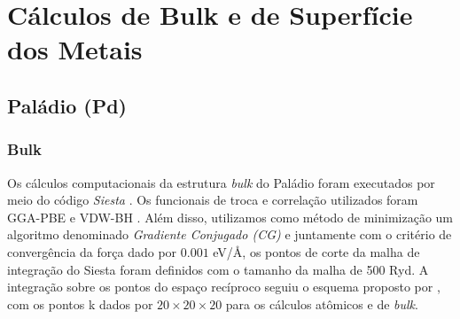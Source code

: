 \chapter{Cálculos de Bulk e de Superfície dos Metais\label{apd:metal}}


\section{Paládio (Pd)}
\subsection{Bulk}


Os cálculos computacionais da estrutura \textit{bulk} do Paládio foram executados por meio do código \textit{Siesta} \cite{siesta}. Os funcionais de troca e correlação utilizados foram GGA-PBE \cite{PBE} e VDW-BH \cite{vdw-bh}. Além disso, utilizamos como método de minimização um algoritmo denominado \textit{Gradiente Conjugado (CG)} e  juntamente com o critério de convergência da força dado por $ 0.001$ eV/$\si{\angstrom}$, os pontos de corte da malha de integração do Siesta foram definidos com o tamanho da malha de 500 Ryd. A integração sobre os pontos do espaço recíproco seguiu o esquema proposto por \citeauthor{pontosk}, com os pontos k dados por $ 20\times20\times20 $ para os cálculos atômicos e de \textit{bulk}.  

